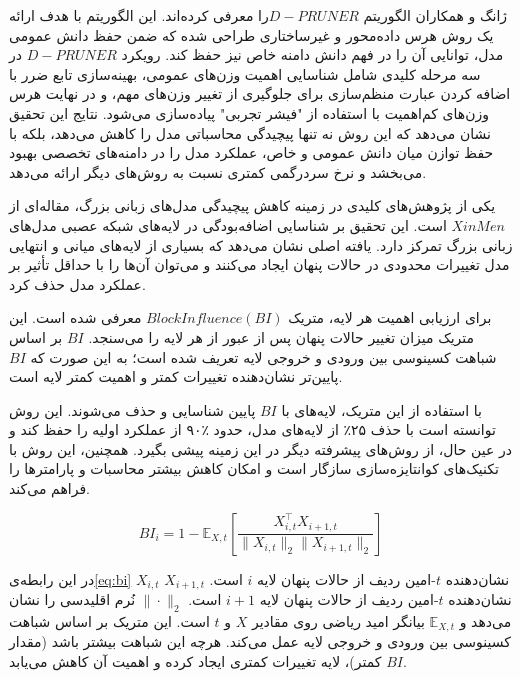  ژانگ و همکاران الگوریتم $D-PRUNER $را معرفی کرده‌اند. این الگوریتم با هدف ارائه یک روش هرس داده‌محور و غیرساختاری طراحی شده که ضمن حفظ دانش عمومی مدل، توانایی آن را در فهم دانش دامنه خاص نیز حفظ کند. رویکرد $D-PRUNER$ در سه مرحله کلیدی شامل شناسایی اهمیت وزن‌های عمومی، بهینه‌سازی تابع ضرر با اضافه کردن عبارت منظم‌سازی  برای جلوگیری از تغییر وزن‌های مهم، و در نهایت هرس وزن‌های کم‌اهمیت با استفاده از "فیشر تجربی" پیاده‌سازی می‌شود. نتایج این تحقیق نشان می‌دهد که این روش نه تنها پیچیدگی محاسباتی مدل را کاهش می‌دهد، بلکه با حفظ توازن میان دانش عمومی و خاص، عملکرد مدل را در دامنه‌های تخصصی بهبود می‌بخشد و نرخ سردرگمی  کمتری نسبت به روش‌های دیگر ارائه می‌دهد\cite{zhang2024pruning}.

یکی از پژوهش‌های کلیدی در زمینه کاهش پیچیدگی مدل‌های زبانی بزرگ، مقاله‌ای از $Xin Men$ است. این تحقیق بر شناسایی اضافه‌بودگی در لایه‌های شبکه عصبی مدل‌های زبانی بزرگ تمرکز دارد. یافته اصلی نشان می‌دهد که بسیاری از لایه‌های میانی و انتهایی مدل تغییرات محدودی در حالات پنهان ایجاد می‌کنند و می‌توان آن‌ها را با حداقل تأثیر بر عملکرد مدل حذف کرد.

برای ارزیابی اهمیت هر لایه، متریک $Block Influence (BI)$ معرفی شده است. این متریک میزان تغییر حالات پنهان پس از عبور از هر لایه را می‌سنجد. $BI$ بر اساس شباهت کسینوسی بین ورودی و خروجی لایه تعریف شده است؛ به این صورت که $BI$ پایین‌تر نشان‌دهنده تغییرات کمتر و اهمیت کمتر لایه است.

با استفاده از این متریک، لایه‌های با $BI$ پایین شناسایی و حذف می‌شوند. این روش توانسته است با حذف ۲۵٪ از لایه‌های مدل، حدود ٪۹۰ از عملکرد اولیه را حفظ کند و در عین حال، از روش‌های پیشرفته دیگر در این زمینه پیشی بگیرد. همچنین، این روش با تکنیک‌های کوانتایزه‌سازی سازگار است و امکان کاهش بیشتر محاسبات و پارامترها را فراهم می‌کند.

\begin{equation}
	BI_i = 1 - \mathbb{E}_{X, t} \left[ \frac{X_{i,t}^\top X_{i+1,t}}{\|X_{i,t}\|_2 \|X_{i+1,t}\|_2} \right]
	\label{eq:bi}
\end{equation}

در این رابطه‌ی\ref{eq:bi} \( X_{i,t} \) نشان‌دهنده \( t \)-امین ردیف از حالات پنهان لایه \( i \) است. \( X_{i+1,t} \) نشان‌دهنده \( t \)-امین ردیف از حالات پنهان لایه \( i+1 \) است. \( \|\cdot\|_2 \) نُرم اقلیدسی را نشان می‌دهد و \( \mathbb{E}_{X, t} \) بیانگر امید ریاضی روی مقادیر \( X \) و \( t \) است. این متریک بر اساس شباهت کسینوسی بین ورودی و خروجی لایه عمل می‌کند. هرچه این شباهت بیشتر باشد (مقدار \( BI \) کمتر)، لایه تغییرات کمتری ایجاد کرده و اهمیت آن کاهش می‌یابد.


